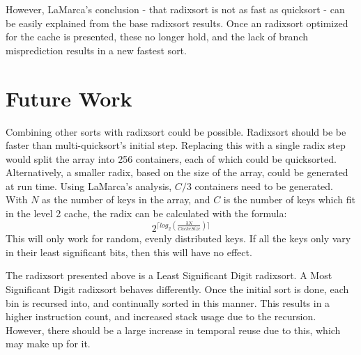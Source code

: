 However, LaMarca's conclusion - that radixsort is not as fast as quicksort - can
be easily explained from the base radixsort results. Once an radixsort optimized
for the cache is presented, these no longer hold, and the lack of branch
misprediction results in a new fastest sort.

\section{Future Work}
\label{radix future work}
Combining other sorts with radixsort could be possible. Radixsort should be be
faster than multi-quicksort's initial step. Replacing this with a single radix
step would split the array into 256 containers, each of which could be
quicksorted. Alternatively, a smaller radix, based on the size of the array,
could be generated at run time. Using LaMarca's analysis, $C/3$ containers need
to be generated. With $N$ as the number of keys in the array, and $C$ is the
number of keys which fit in the level 2 cache, the radix can be calculated with
the formula:
$$2^{\lceil{}log_2(\frac{3N}{CacheSize})\rceil{}}$$
This will only work for random, evenly distributed keys. If all the keys only
vary in their least significant bits, then this will have no effect.

The radixsort presented above is a Least Significant Digit radixsort. A Most
Significant Digit radixsort behaves differently. Once the initial sort is done,
each bin is recursed into, and continually sorted in this manner. This results
in a higher instruction count, and increased stack usage due to the recursion.
However, there should be a large increase in temporal reuse due to this, which
may make up for it.
